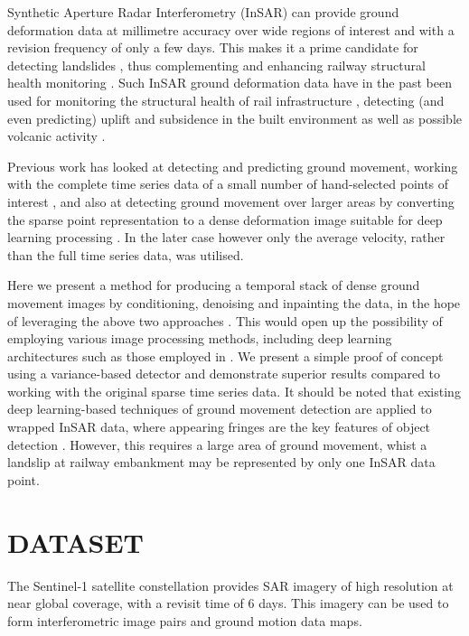 \documentclass{article}
\begin{document}
Synthetic Aperture Radar Interferometry (InSAR) can provide ground deformation data at millimetre accuracy over wide regions of interest and with a revision frequency of only a few days. This makes it a prime candidate for detecting landslides \cite{Tofani}, thus complementing and enhancing railway structural health monitoring \cite{NORTH}. Such InSAR ground deformation data have in the past been used for  monitoring the structural health of rail infrastructure \cite{CHANG} \cite{NORTH}, detecting (and even predicting) uplift and subsidence in the built environment \cite{PUI1} \cite{HILL} as well as possible volcanic activity \cite{PUI2}. 

Previous work has looked at detecting and predicting ground movement, working with the complete time series data of a small number of hand-selected points of interest \cite{HILL}, and also at detecting ground movement over larger areas by converting the sparse point representation to a dense deformation image suitable for deep learning processing \cite{PUI1}. In the later case however only the average velocity, rather than the full time series data, was utilised.

Here we present a method for producing a temporal stack of dense ground movement images by conditioning, denoising and inpainting the data, in the hope of leveraging the above two approaches \cite{HILL} \cite{PUI1}. This would open up the possibility of employing various image processing methods, including deep learning architectures such as those employed in \cite{PUI1}. We present a simple proof of concept using a variance-based detector and demonstrate superior results compared to working with the original sparse time series data. It should be noted that existing deep learning-based techniques of ground movement detection are applied to wrapped InSAR data, where appearing fringes are the key features of object detection \cite{InSAR2018}. However, this requires a large area of ground movement, whist a landslip at railway embankment may be represented by only one InSAR data point.
 
\section{DATASET}
The Sentinel-1 satellite constellation provides SAR imagery of high resolution at near global coverage, with a revisit time of 6 days. This imagery can be used to form interferometric image pairs and ground motion data maps. %
\end{document}
